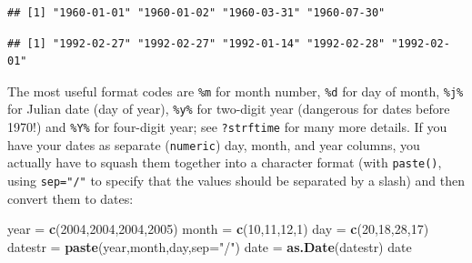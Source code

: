 \documentclass[11pt,]{article}
\newenvironment{Shaded}{\begin{snugshade}}{\end{snugshade}}
\newcommand{\KeywordTok}[1]{\textcolor[rgb]{0.13,0.29,0.53}{\textbf{#1}}}
\newcommand{\DataTypeTok}[1]{\textcolor[rgb]{0.13,0.29,0.53}{#1}}
\newcommand{\DecValTok}[1]{\textcolor[rgb]{0.00,0.00,0.81}{#1}}
\newcommand{\StringTok}[1]{\textcolor[rgb]{0.31,0.60,0.02}{#1}}
\newcommand{\NormalTok}[1]{#1}
\begin{document}
\begin{verbatim}
## [1] "1960-01-01" "1960-01-02" "1960-03-31" "1960-07-30"
\end{verbatim}

\begin{Shaded}
\end{Shaded}

\begin{verbatim}
## [1] "1992-02-27" "1992-02-27" "1992-01-14" "1992-02-28" "1992-02-01"
\end{verbatim}

The most useful format codes are \texttt{\%m} for month number,
\texttt{\%d} for day of month, \texttt{\%j\%} for Julian date (day of
year), \texttt{\%y\%} for two-digit year (dangerous for dates before
1970!) and \texttt{\%Y\%} for four-digit year; see \texttt{?strftime}
for many more details. If you have your dates as separate
(\texttt{numeric}) day, month, and year columns, you actually have to
squash them together into a character format (with \texttt{paste()},
using \texttt{sep="/"} to specify that the values should be separated by
a slash) and then convert them to dates:

\begin{Shaded}
\begin{Highlighting}[]
\NormalTok{year =}\StringTok{ }\KeywordTok{c}\NormalTok{(}\DecValTok{2004}\NormalTok{,}\DecValTok{2004}\NormalTok{,}\DecValTok{2004}\NormalTok{,}\DecValTok{2005}\NormalTok{)}
\NormalTok{month =}\StringTok{ }\KeywordTok{c}\NormalTok{(}\DecValTok{10}\NormalTok{,}\DecValTok{11}\NormalTok{,}\DecValTok{12}\NormalTok{,}\DecValTok{1}\NormalTok{)}
\NormalTok{day =}\StringTok{ }\KeywordTok{c}\NormalTok{(}\DecValTok{20}\NormalTok{,}\DecValTok{18}\NormalTok{,}\DecValTok{28}\NormalTok{,}\DecValTok{17}\NormalTok{)}
\NormalTok{datestr =}\StringTok{ }\KeywordTok{paste}\NormalTok{(year,month,day,}\DataTypeTok{sep=}\StringTok{"/"}\NormalTok{)}
\NormalTok{date =}\StringTok{ }\KeywordTok{as.Date}\NormalTok{(datestr)}
\NormalTok{date}
\end{Highlighting}
\end{Shaded}
\end{document}
